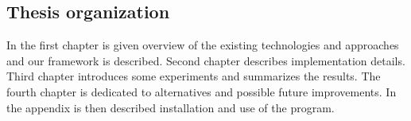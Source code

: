 \subsection*{Thesis organization}
In the first chapter is given overview of the existing technologies and approaches and our framework is described. Second chapter describes implementation details. Third chapter introduces some experiments and summarizes the results. The fourth chapter is dedicated to alternatives and possible future improvements. In the appendix is then described installation and use of the program.